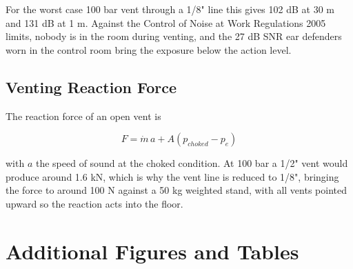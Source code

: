 For the worst case 100 bar vent through a 1/8" line this gives 102 dB at 30 m and 131 dB at 1 m. Against the Control of Noise at Work Regulations 2005 limits, nobody is in the room during venting, and the 27 dB SNR ear defenders worn in the control room bring the exposure below the action level.

\subsection{Venting Reaction Force}

The reaction force of an open vent is

\begin{equation}
    F = \dot{m}\, a + A \left(p_{choked} - p_e\right)
    \label{eq:vent_force}
\end{equation}

with $a$ the speed of sound at the choked condition. At 100 bar a 1/2" vent would produce around 1.6 kN, which is why the vent line is reduced to 1/8", bringing the force to around 100 N against a 50 kg weighted stand, with all vents pointed upward so the reaction acts into the floor.

\section{Additional Figures and Tables}
\label{sec:appendix_extra}

